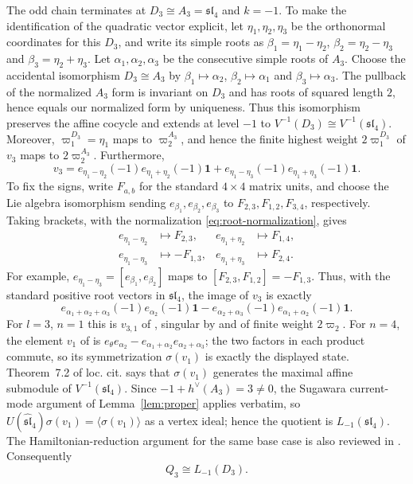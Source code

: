 \documentclass[11pt]{article}
\begin{document}
The odd chain terminates at $D_3\cong A_3=\mathfrak{sl}_4$ and $k=-1$.
To make the identification of the quadratic vector explicit, let
$\eta_1,\eta_2,\eta_3$ be the orthonormal coordinates for this $D_3$,
and write its simple roots as $\beta_1=\eta_1-\eta_2$,
$\beta_2=\eta_2-\eta_3$ and $\beta_3=\eta_2+\eta_3$.
Let $\alpha_1,\alpha_2,\alpha_3$ be the consecutive simple roots of $A_3$.
Choose the accidental isomorphism $D_3\cong A_3$ by
$\beta_1\mapsto\alpha_2$, $\beta_2\mapsto\alpha_1$ and
$\beta_3\mapsto\alpha_3$.  The pullback of the normalized $A_3$ form is
invariant on $D_3$ and has roots of squared length $2$, hence equals our
normalized form by uniqueness.  Thus this isomorphism preserves the affine
cocycle and extends at level $-1$ to
$V^{-1}(D_3)\cong V^{-1}(\mathfrak{sl}_4)$.  Moreover,
$\varpi^{D_3}_1=\eta_1$ maps to $\varpi^{A_3}_2$, and hence the finite
highest weight $2\varpi^{D_3}_1$ of $v_3$ maps to $2\varpi^{A_3}_2$.
Furthermore,
$$
 v_3=
 e_{\eta_1-\eta_2}(-1)e_{\eta_1+\eta_2}(-1)\mathbf1
 +e_{\eta_1-\eta_3}(-1)e_{\eta_1+\eta_3}(-1)\mathbf1.
$$
To fix the signs, write $F_{a,b}$ for the standard $4\times4$ matrix
units, and choose the Lie algebra isomorphism sending
$e_{\beta_1},e_{\beta_2},e_{\beta_3}$ to $F_{2,3},F_{1,2},F_{3,4}$,
respectively.  Taking brackets, with the normalization
\eqref{eq:root-normalization}, gives
$$
 \begin{aligned}
 e_{\eta_1-\eta_2}&\longmapsto F_{2,3},&
 e_{\eta_1+\eta_2}&\longmapsto F_{1,4},\\
 e_{\eta_1-\eta_3}&\longmapsto-F_{1,3},&
 e_{\eta_1+\eta_3}&\longmapsto F_{2,4}.
 \end{aligned}
$$
For example, $e_{\eta_1-\eta_3}=[e_{\beta_1},e_{\beta_2}]$ maps to
$[F_{2,3},F_{1,2}]=-F_{1,3}$.
Thus, with the standard positive root vectors in $\mathfrak{sl}_4$,
the image of $v_3$ is exactly
$$
 e_{\alpha_1+\alpha_2+\alpha_3}(-1)e_{\alpha_2}(-1)\mathbf1
 -e_{\alpha_2+\alpha_3}(-1)e_{\alpha_1+\alpha_2}(-1)\mathbf1.
$$
For $l=3$, $n=1$ this is $v_{3,1}$ of \cite[(5.1)]{AdamovicPerse},
singular by \cite[Theorem~4.1]{AdamovicPerse} and of finite weight
$2\varpi_2$.  For $n=4$, the element $v_1$ of
\cite[\S7]{ArakawaMoreau} is
$e_{\theta}e_{\alpha_2}-e_{\alpha_1+\alpha_2}e_{\alpha_2+\alpha_3}$;
the two factors in each product commute, so its symmetrization $\sigma(v_1)$
is exactly the displayed state.  Theorem~7.2 of loc. cit. says that
$\sigma(v_1)$ generates the maximal affine submodule of
$V^{-1}(\mathfrak{sl}_4)$.  Since $-1+h^\vee(A_3)=3\ne0$, the Sugawara
current-mode argument of Lemma~\ref{lem:proper} applies verbatim, so
$U(\widehat{\mathfrak{sl}}_4)\sigma(v_1)=\langle\sigma(v_1)\rangle$ as a
vertex ideal; hence the quotient is $L_{-1}(\mathfrak{sl}_4)$.
The Hamiltonian-reduction argument for the same base case is also reviewed in
\cite[\S5.1]{APV}.  Consequently
\begin{equation}\label{eq:base}
 Q_3\cong L_{-1}(D_3).
\end{equation}
\end{document}
